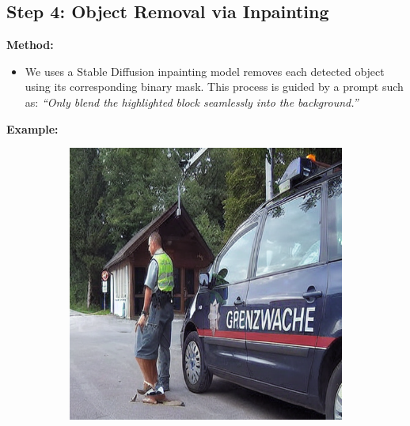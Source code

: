 \documentclass[11pt,letterpaper]{article}
\begin{document}
\subsection*{Step 4: Object Removal via Inpainting}

\textbf{Method:}
\begin{itemize}
  \item We uses a Stable Diffusion inpainting model removes each detected object using its corresponding binary mask. This process is guided by a prompt such as: \emph{``Only blend the highlighted block seamlessly into the background.''}
\end{itemize}

\textbf{Example:}
\begin{figure}[h]
    \centering
    \begin{subfigure}[b]{0.3\textwidth}
        \centering
        \includegraphics[width=\textwidth]{midterm_report/assets/output_dog.png}
        \label{fig:mask_dog}
    \end{subfigure}
    \hfill
    \begin{subfigure}[b]{0.3\textwidth}
        \centering

\end{subfigure}
\end{figure}
\end{document}

